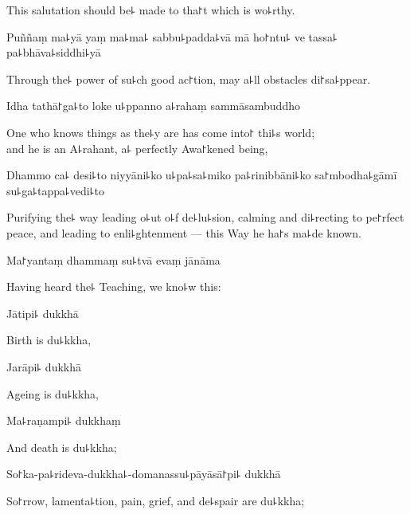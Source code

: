 \begin{english}
  This salutation should be꜕ made to tha꜓t which is wo꜕rthy.
\end{english}

Puññaṃ ma꜕yā yaṃ ma꜕ma꜕ sabbu꜕padda꜕vā mā ho꜓ntu꜕ ve tassa꜕ pa꜕bhāva꜕siddhi꜕yā

\begin{english}
  Through the꜕ power of su꜕ch good ac꜓tion, may a꜕ll obstacles di꜓sa꜕ppear.
\end{english}

Idha tathā꜓ga꜕to loke u꜕ppanno a꜕rahaṃ sammāsambuddho

\begin{english}
  One who knows things as the꜕y are has come into꜓ thi꜕s world; \\and he is an A꜕rahant, a꜕ perfectly Awa꜓kened being,
\end{english}

Dhammo ca꜕ desi꜕to niyyāni꜕ko u꜕pa꜕sa꜕miko pa꜕rinibbāni꜕ko sa꜓mbodha꜕gāmī su꜕ga꜕tappa꜕vedi꜕to

\begin{english}
  Purifying the꜕ way leading o꜕ut o꜕f de꜕lu꜕sion, calming and di꜕recting to pe꜓rfect peace, and leading to enli꜕ghtenment --- this Way he ha꜓s ma꜕de known.
\end{english}

Ma꜓yantaṃ dhammaṃ su꜕tvā evaṃ jānāma

\begin{english}
  Having heard the꜕ Teaching, we kno꜕w this:
\end{english}

%
Jātipi꜕ dukkhā

\begin{english}
  Birth is du꜕kkha,
\end{english}

Jarāpi꜕ dukkhā

\begin{english}
  Ageing is du꜕kkha,
\end{english}

Ma꜕raṇampi꜕ dukkhaṃ

\begin{english}
  And death is du꜕kkha;
\end{english}

So꜓ka-pa꜕rideva-dukkha꜕-domanassu꜕pāyāsā꜓pi꜕ dukkhā

\begin{english}
  So꜓rrow, lamenta꜕tion, pain, grief, and de꜕spair are du꜕kkha;
\end{english}

